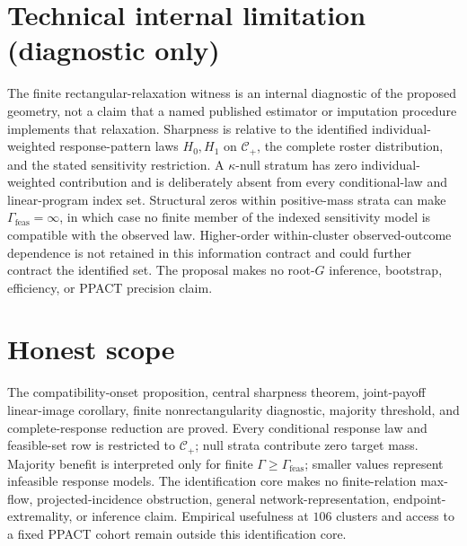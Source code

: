 \documentclass{article}
\begin{document}
\section*{Technical internal limitation (diagnostic only)}

The finite rectangular-relaxation witness is an internal diagnostic of the proposed geometry, not a claim that a named published estimator or imputation procedure implements that relaxation. Sharpness is relative to the identified individual-weighted response-pattern laws \(H_0,H_1\) on \(\mathcal C_{+}\), the complete roster distribution, and the stated sensitivity restriction. A \(\kappa\)-null stratum has zero individual-weighted contribution and is deliberately absent from every conditional-law and linear-program index set. Structural zeros within positive-mass strata can make \(\Gamma_{\mathrm{feas}}=\infty\), in which case no finite member of the indexed sensitivity model is compatible with the observed law. Higher-order within-cluster observed-outcome dependence is not retained in this information contract and could further contract the identified set. The proposal makes no root-\(G\) inference, bootstrap, efficiency, or PPACT precision claim.

\section{Honest scope}

The compatibility-onset proposition, central sharpness theorem, joint-payoff linear-image corollary, finite nonrectangularity diagnostic, majority threshold, and complete-response reduction are proved. Every conditional response law and feasible-set row is restricted to \(\mathcal C_{+}\); null strata contribute zero target mass. Majority benefit is interpreted only for finite \(\Gamma\geq\Gamma_{\mathrm{feas}}\); smaller values represent infeasible response models. The identification core makes no finite-relation max-flow, projected-incidence obstruction, general network-representation, endpoint-extremality, or inference claim. Empirical usefulness at \(106\) clusters and access to a fixed PPACT cohort remain outside this identification core.
\end{document}
